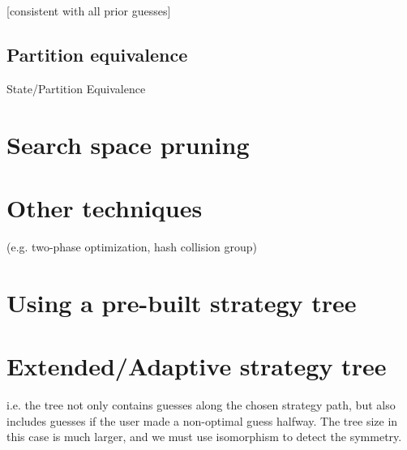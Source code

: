 [consistent with all prior guesses]

\subsection{Partition equivalence}

State/Partition Equivalence

\section{Search space pruning}

\section{Other techniques}

(e.g. two-phase optimization, hash collision group)

\section{Using a pre-built strategy tree}

\section{Extended/Adaptive strategy tree}

i.e. the tree not only contains guesses along the chosen strategy path, but also includes guesses if the user made a non-optimal guess halfway. The tree size in this case is much larger, and we must use isomorphism to detect the symmetry.

 
